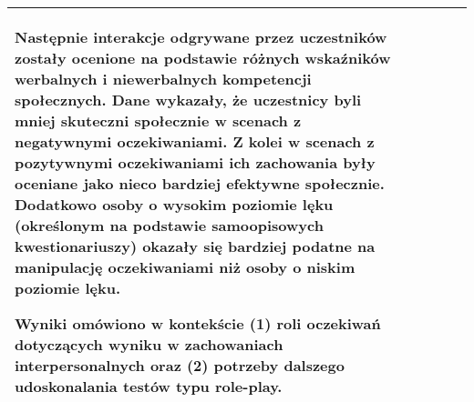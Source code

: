 \documentclass{article}
\begin{document}
\begin{landscape}
\begin{small}
\begin{tabularx}{\linewidth}{|p{0.4cm}|p{4cm}|p{3.4cm}|p{4cm}|X|}
Następnie interakcje odgrywane przez uczestników zostały ocenione na podstawie różnych wskaźników werbalnych i niewerbalnych kompetencji społecznych. Dane wykazały, że \textcolor{red!70!black}{uczestnicy byli mniej skuteczni społecznie w scenach z negatywnymi oczekiwaniami. Z kolei w scenach z pozytywnymi oczekiwaniami ich zachowania były oceniane jako nieco bardziej efektywne społecznie. Dodatkowo osoby o wysokim poziomie lęku (określonym na podstawie samoopisowych kwestionariuszy) okazały się bardziej podatne na manipulację oczekiwaniami niż osoby o niskim poziomie lęku.}

Wyniki omówiono w kontekście (1) roli oczekiwań dotyczących wyniku w zachowaniach interpersonalnych oraz (2) potrzeby dalszego udoskonalania testów typu role-play. \\
\hline

\end{tabularx}

\end{small}

\end{landscape} %
\end{document}
